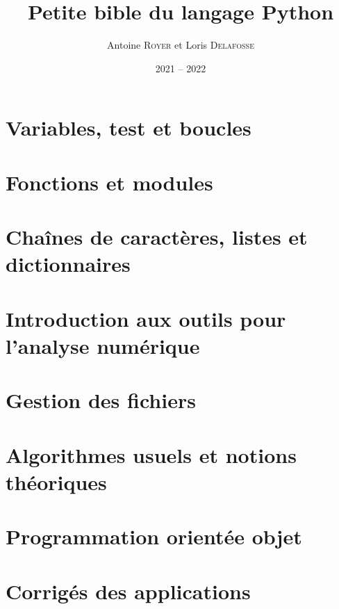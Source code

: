 \documentclass[french, a4paper, 12pt, openany]{book}
\title{\sc Petite bible du langage Python}
\author{Antoine \textsc{Royer} et Loris \textsc{Delafosse}}
\date{2021 -- 2022}
\begin{document}
 \maketitle \tableofcontents

	\chapter{Variables, test et boucles} \label{chap_1}
		
	
	\chapter{Fonctions et modules}
		
	
	\chapter{Chaînes de caractères, listes et dictionnaires}
	
	\chapter{Introduction aux outils pour l'analyse numérique} \label{chap_4}
	
	\chapter{Gestion des fichiers}
	
	\chapter{Algorithmes usuels et notions théoriques}
	
	\chapter{Programmation orientée objet}
	
	\chapter{Corrigés des applications}
\end{document}
